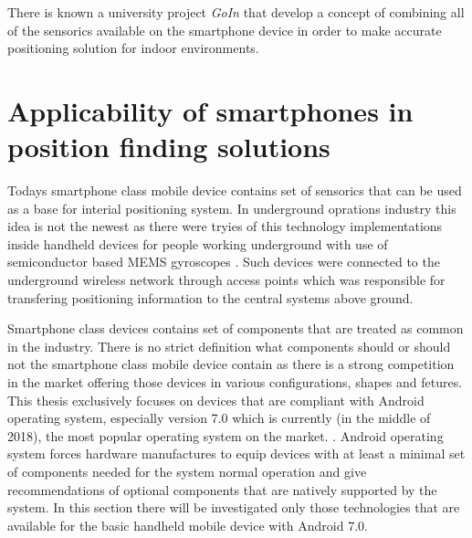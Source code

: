 \documentclass[../main.tex]{subfiles}
\begin{document}
There is known a university project \textit{GoIn} \cite{article_smartphone_features_for_indoor_positioning} that develop a concept of combining all of the sensorics available on the smartphone device in order to make accurate positioning solution for indoor environments.

\section{Applicability of smartphones in position finding solutions} %
\label{sec:mobile_device_dedicated_positioning_systems}

Todays smartphone class mobile device contains set of sensorics that can be used as a base for interial positioning system. In underground oprations industry this idea is not the newest as there were tryies of this technology implementations inside handheld devices for people working underground with use of semiconductor based MEMS gyroscopes \cite{Thesis_CM}. Such devices were connected to the underground wireless network through access points which was responsible for transfering positioning information to the central systems above ground.

Smartphone class devices contains set of components that are treated as common in the industry. There is no strict definition what components should or should not the smartphone class mobile device contain as there is a strong competition in the market offering those devices in various configurations, shapes and fetures. This thesis exclusively focuses on devices that are compliant with Android operating system, especially version 7.0 which is currently (in the middle of 2018), the most popular operating system on the market. \cite{android7.0_cdd}. Android operating system forces hardware manufactures to equip devices with at least a minimal set of components needed for the system normal operation and give recommendations of optional components that are natively supported by the system\cite{android7.0_cdd}. In this section there will be investigated only those technologies that are available for the basic handheld mobile device with Android 7.0.
\end{document}
